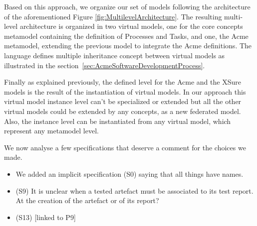 Based on this approach, we organize our set of models following the architecture of the aforementioned Figure \ref{fig:MultilevelArchitecture}. The resulting multi-level architecture is organized in two virtual models, one for the core concepts metamodel containing the definition of Processes and Tasks, and one, the Acme metamodel, extending the previous model to integrate the Acme definitions. The \FML language defines multiple inheritance concept between virtual models as illustrated in the section~\ref{sec:AcmeSoftwareDevelopmentProcess}.

Finally as explained previously, the defined level for the Acme  and the XSure models is the result of the instantiation of virtual models. In our approach this virtual model instance level can't be specialized or extended but all the other virtual models could be extended by any concepts, as a new federated model. 
Also, the instance level can be instantiated from any virtual model, which represent any metamodel level. 


We now analyse a few specifications that deserve a comment for the choices we made. 

\begin{itemize}
    \item We added an implicit specification (S0) saying that all things have names.
    \item (S9) It is unclear when a tested artefact must be associated to its test report. At the creation of the artefact or of its report? 
    \item (S13) [linked to P9] 
\end{itemize} 



